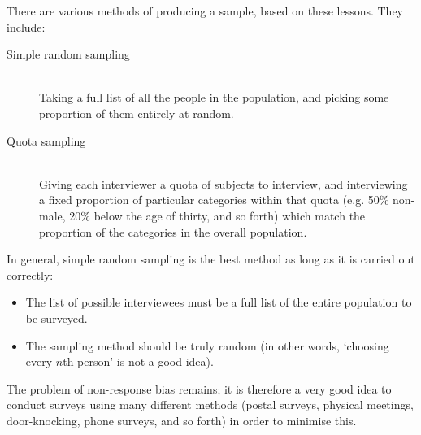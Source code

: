 There are various methods of producing a sample, based on these lessons. They include:
\begin{description}
  \item[Simple random sampling] \hfill \\
    Taking a full list of all the people in the population, and picking some proportion of them entirely at random.
  \item[Quota sampling] \hfill \\
    Giving each interviewer a quota of subjects to interview, and interviewing a fixed proportion of particular categories
    within that quota (e.g. 50\% non-male, 20\% below the age of thirty, and so forth) which match the proportion of the
    categories in the overall population.
\end{description}

In general, simple random sampling is the best method as long as it is carried out correctly:
\begin{itemize}
  \item The list of possible interviewees must be a full list of the entire population to be surveyed.
  \item The sampling method should be truly random (in other words, `choosing every $ n$th person' is not a good idea).
\end{itemize}

The problem of non-response bias remains; it is therefore a very good idea to conduct surveys using many different
methods (postal surveys, physical meetings, door-knocking, phone surveys, and so forth) in order to minimise this.

